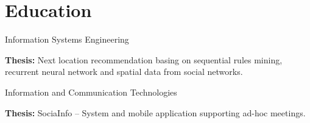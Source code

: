 
\section{Education} 

\sectionsep

Information Systems Engineering

\textbf{Thesis:} Next location recommendation basing on sequential rules mining, recurrent neural network and spatial data from social networks.
\sectionsep

Information and Communication Technologies

\textbf{Thesis:} SociaInfo – System and mobile application supporting ad-hoc meetings.
\sectionsep


%

